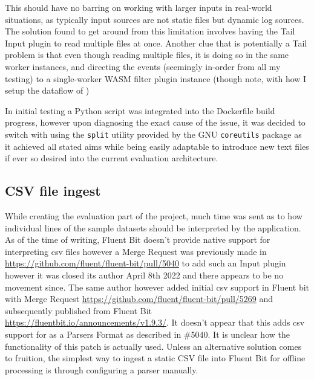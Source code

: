 This should have no barring on working with larger inputs in real-world situations, as typically input sources are not static files but dynamic log sources. The solution found to get around from this limitation involves having the Tail Input plugin to read multiple files at once. Another clue that is potentially a Tail problem is that even though reading multiple files, it is doing so in the same worker instances, and directing the events (seemingly in-order from all my testing) to a single-worker WASM filter plugin instance (though note, with how I setup the dataflow of ) 

In initial testing a Python script was integrated into the Dockerfile build progress, however upon diagnosing the exact cause of the issue, it was decided to switch with using the \texttt{split} utility provided by the GNU \texttt{coreutils} package as it achieved all stated aims while being easily adaptable to introduce new text files if ever so desired into the current evaluation architecture.


\subsection{CSV file ingest}
While creating the evaluation part of the project, much time was sent as to how individual lines of the sample datasets should be interpreted by the application. As of the time of writing, Fluent Bit doesn't provide native support for interpreting \acrshort{csv} files however a Merge Request was previously made in \href{#5040}{https://github.com/fluent/fluent-bit/pull/5040} to add such an Input plugin however it was closed its author April 8th 2022 and there appears to be no movement since. The same author however added initial \acrshort{csv} support in Fluent bit with Merge Request \href{#5269}{https://github.com/fluent/fluent-bit/pull/5269} and subsequently published from Fluent Bit \href{v1.9.3}{https://fluentbit.io/announcements/v1.9.3/}. It doesn't appear that this adds \acrshort{csv} support for as a Parsers Format as described in \#5040. It is unclear how the functionality of this patch is actually used. Unless an alternative solution comes to fruition, the simplest way to ingest a static CSV file into Fluent Bit for offline processing is through configuring a parser manually.

